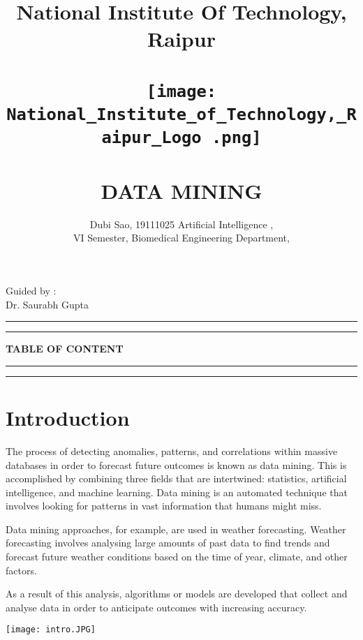 \documentclass[12pt,letterpaper]{article}
\begin{document}
\title{
\textbf{National Institute Of Technology, Raipur\\ 
 \\ \texttt{[image: National\_Institute\_of\_Technology,\_Raipur\_Logo .png]}
\\ \\
DATA MINING}
}

\author{Dubi Sao, 19111025 
Artificial Intelligence ,\\ VI Semester,
        Biomedical Engineering Department,\\
        }
\date{}
\maketitle
\begin{flushright}
    Guided by :\\
    Dr. Saurabh Gupta
\end{flushright}
\rule{\textwidth}{1pt}
\begin{abstract}



\end{abstract}
\rule{\textwidth}{1pt}
\newpage
\textbf{TABLE OF CONTENT}\\
\rule{\textwidth}{1pt}
\tableofcontents
\rule{\textwidth}{1pt}

\section{Introduction}
The process of detecting anomalies, patterns, and correlations within massive databases in order to forecast future outcomes is known as data mining. This is accomplished by combining three fields that are intertwined: statistics, artificial intelligence, and machine learning. Data mining is an automated technique that involves looking for patterns in vast information that humans might miss.


Data mining approaches, for example, are used in weather forecasting. Weather forecasting involves analysing large amounts of past data to find trends and forecast future weather conditions based on the time of year, climate, and other factors.



As a result of this analysis, algorithms or models are developed that collect and analyse data in order to anticipate outcomes with increasing accuracy.
\begin{center} \texttt{[image: intro.JPG]}
\end{center}
\end{document}
